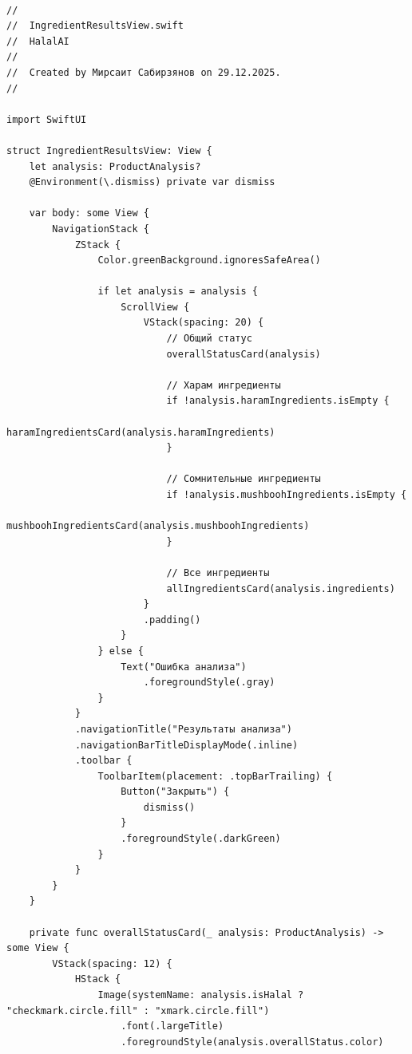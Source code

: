 \begin{lstlisting}[basicstyle=\tiny\ttfamily,breaklines=true]

//
//  IngredientResultsView.swift
//  HalalAI
//
//  Created by Мирсаит Сабирзянов on 29.12.2025.
//

import SwiftUI

struct IngredientResultsView: View {
    let analysis: ProductAnalysis?
    @Environment(\.dismiss) private var dismiss
    
    var body: some View {
        NavigationStack {
            ZStack {
                Color.greenBackground.ignoresSafeArea()
                
                if let analysis = analysis {
                    ScrollView {
                        VStack(spacing: 20) {
                            // Общий статус
                            overallStatusCard(analysis)
                            
                            // Харам ингредиенты
                            if !analysis.haramIngredients.isEmpty {
                                haramIngredientsCard(analysis.haramIngredients)
                            }
                            
                            // Сомнительные ингредиенты
                            if !analysis.mushboohIngredients.isEmpty {
                                mushboohIngredientsCard(analysis.mushboohIngredients)
                            }
                            
                            // Все ингредиенты
                            allIngredientsCard(analysis.ingredients)
                        }
                        .padding()
                    }
                } else {
                    Text("Ошибка анализа")
                        .foregroundStyle(.gray)
                }
            }
            .navigationTitle("Результаты анализа")
            .navigationBarTitleDisplayMode(.inline)
            .toolbar {
                ToolbarItem(placement: .topBarTrailing) {
                    Button("Закрыть") {
                        dismiss()
                    }
                    .foregroundStyle(.darkGreen)
                }
            }
        }
    }
    
    private func overallStatusCard(_ analysis: ProductAnalysis) -> some View {
        VStack(spacing: 12) {
            HStack {
                Image(systemName: analysis.isHalal ? "checkmark.circle.fill" : "xmark.circle.fill")
                    .font(.largeTitle)
                    .foregroundStyle(analysis.overallStatus.color)
                

\end{lstlisting}
